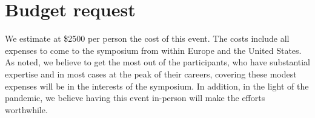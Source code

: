 \section{Budget request}

We estimate at \$2500 per person the cost of this event. The costs
include all expenses to come to the symposium from within Europe and the
United States. As noted, we believe to get the most out of the
participants, who have substantial expertise and in most cases at the
peak of their careers, covering these modest expenses will be in the
interests of the symposium. In addition, in the light of the pandemic,
we believe having this event in-person will make the efforts worthwhile.

